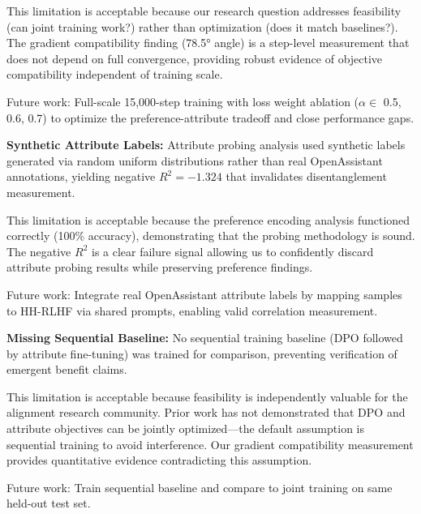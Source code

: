 This limitation is acceptable because our research question addresses feasibility (can joint training work?) rather than optimization (does it match baselines?). The gradient compatibility finding (78.5° angle) is a step-level measurement that does not depend on full convergence, providing robust evidence of objective compatibility independent of training scale.

Future work: Full-scale 15,000-step training with loss weight ablation ($\alpha \in$ {0.5, 0.6, 0.7}) to optimize the preference-attribute tradeoff and close performance gaps.

\textbf{Synthetic Attribute Labels:} Attribute probing analysis used synthetic labels generated via random uniform distributions rather than real OpenAssistant annotations, yielding negative $R^{2}=-1.324$ that invalidates disentanglement measurement.

This limitation is acceptable because the preference encoding analysis functioned correctly (100\% accuracy), demonstrating that the probing methodology is sound. The negative $R^2$ is a clear failure signal allowing us to confidently discard attribute probing results while preserving preference findings.

Future work: Integrate real OpenAssistant attribute labels by mapping samples to HH-RLHF via shared prompts, enabling valid correlation measurement.

\textbf{Missing Sequential Baseline:} No sequential training baseline (DPO followed by attribute fine-tuning) was trained for comparison, preventing verification of emergent benefit claims.

This limitation is acceptable because feasibility is independently valuable for the alignment research community. Prior work has not demonstrated that DPO and attribute objectives can be jointly optimized---the default assumption is sequential training to avoid interference. Our gradient compatibility measurement provides quantitative evidence contradicting this assumption.

Future work: Train sequential baseline and compare to joint training on same held-out test set.
